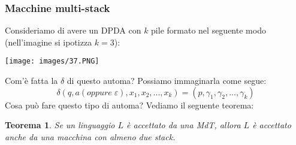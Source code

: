 \documentclass[12pt]{article}
\newtheorem{Teorema}{Teorema}[subsection]
\begin{document}
\subsubsection{Macchine multi-stack}
Consideriamo di avere un DPDA con $k$ pile formato nel seguente modo (nell'imagine si ipotizza $k = 3$):
\begin{center}
    \texttt{[image: images/37.PNG]}
\end{center}
Com'è fatta la $\delta$ di questo automa? Possiamo immaginarla come segue:
$$\delta(q, a(oppure \; \varepsilon), x_1, x_2, ..., x_k) = (p, \gamma_1, \gamma_2, ..., \gamma_k)$$
Cosa può fare questo tipo di automa? Vediamo il seguente teorema:
\begin{Teorema}
    Se un linguaggio $L$ è accettato da una MdT, allora $L$ è accettato anche da una macchina con almeno due stack.
\end{Teorema}
\end{document}
